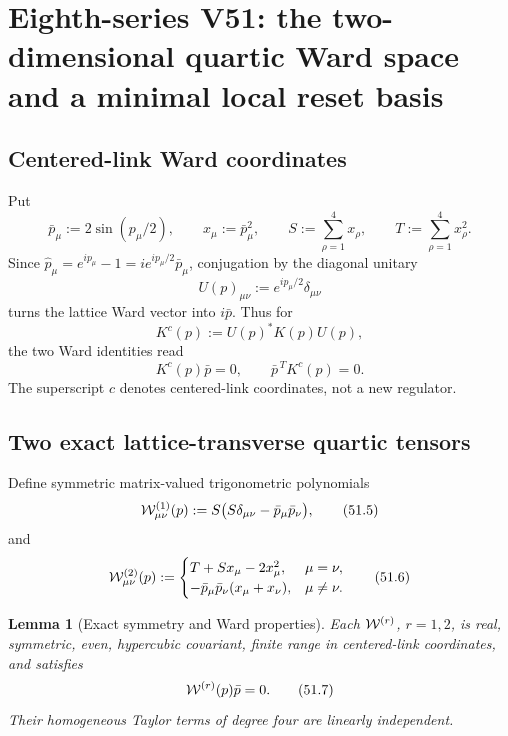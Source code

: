\documentclass[11pt,oneside]{book}
\newtheorem{lemma}[theorem]{Lemma}
\theoremstyle{definition}
\theoremstyle{remark}
\begin{document}


\section{Eighth-series V51: the two-dimensional quartic Ward space
and a minimal local reset basis}
\label{sec:e8v51}

\subsection{Centered-link Ward coordinates}

Put
\[
 \bar p_\mu:=2\sin(p_\mu/2),\qquad
 x_\mu:=\bar p_\mu^2,\qquad
 S:=\sum_{\rho=1}^4x_\rho,\qquad
 T:=\sum_{\rho=1}^4x_\rho^2.                                 \tag{51.1}
\]
Since
\(\widehat p_\mu=e^{ip_\mu}-1
=i e^{ip_\mu/2}\bar p_\mu\), conjugation by the diagonal unitary
\[
 U(p)_{\mu\nu}:=e^{ip_\mu/2}\delta_{\mu\nu}                   \tag{51.2}
\]
turns the lattice Ward vector into \(i\bar p\).  Thus for
\[
 K^c(p):=U(p)^*K(p)U(p),                                     \tag{51.3}
\]
the two Ward identities read
\[
 K^c(p)\bar p=0,\qquad \bar p^{\,T}K^c(p)=0.                 \tag{51.4}
\]
The superscript \(c\) denotes centered-link coordinates, not a new
regulator.

\subsection{Two exact lattice-transverse quartic tensors}

Define symmetric matrix-valued trigonometric polynomials
\[
 {\cal W}^{(1)}_{\mu\nu}(p)
 :=S\bigl(S\delta_{\mu\nu}-\bar p_\mu\bar p_\nu\bigr),         \tag{51.5}
\]
and
\[
 {\cal W}^{(2)}_{\mu\nu}(p)
 :=\begin{cases}
 T+Sx_\mu-2x_\mu^2,&\mu=\nu,\\
 -\bar p_\mu\bar p_\nu(x_\mu+x_\nu),&\mu\ne\nu.
 \end{cases}                                                  \tag{51.6}
\]

\begin{lemma}[Exact symmetry and Ward properties]
\label{lem:e8v51-two-tensors}
Each \({\cal W}^{(r)}\), \(r=1,2\), is real, symmetric, even,
hypercubic covariant, finite range in centered-link coordinates,
and satisfies
\[
 {\cal W}^{(r)}(p)\bar p=0.                                  \tag{51.7}
\]
Their homogeneous Taylor terms of degree four are linearly
independent.
\end{lemma}
\end{document}
